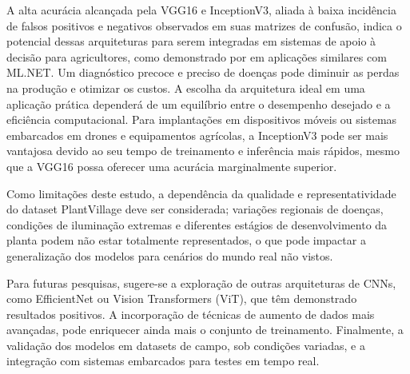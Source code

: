 \documentclass[10pt,conference]{IEEEtran}
\begin{document}
A alta acurácia alcançada pela VGG16 e InceptionV3, aliada à baixa incidência de falsos positivos e negativos observados em suas matrizes de confusão, indica o potencial dessas arquiteturas para serem integradas em sistemas de apoio à decisão para agricultores, como demonstrado por \cite{tessele2024modelo} em aplicações similares com ML.NET. Um diagnóstico precoce e preciso de doenças pode diminuir as perdas na produção e otimizar os custos. A escolha da arquitetura ideal em uma aplicação prática dependerá de um equilíbrio entre o desempenho desejado e a eficiência computacional. Para implantações em dispositivos móveis ou sistemas embarcados em drones e equipamentos agrícolas, a InceptionV3 pode ser mais vantajosa devido ao seu tempo de treinamento e inferência mais rápidos, mesmo que a VGG16 possa oferecer uma acurácia marginalmente superior. 

Como limitações deste estudo, a dependência da qualidade e representatividade do dataset PlantVillage deve ser considerada; variações regionais de doenças, condições de iluminação extremas e diferentes estágios de desenvolvimento da planta podem não estar totalmente representados, o que pode impactar a generalização dos modelos para cenários do mundo real não vistos. 

Para futuras pesquisas, sugere-se a exploração de outras arquiteturas de CNNs, como EfficientNet ou Vision Transformers (ViT), que têm demonstrado resultados positivos. A incorporação de técnicas de aumento de dados mais avançadas, pode enriquecer ainda mais o conjunto de treinamento. Finalmente, a validação dos modelos em datasets de campo, sob condições variadas, e a integração com sistemas embarcados para testes em tempo real. 




\end{document}
